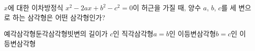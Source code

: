$x$에 대한 이차방정식 $x^2-2ax+b^2-c^2=0$이 허근을 가질 때, 양수 $a$, $b$, $c$를 세 변으로 하는 삼각형은 어떤 삼각형인가?
\begin{choicesv}{예각삼각형}{둔각삼각형}{빗변의 길이가 $c$인 직각삼각형}{$a=b$인 이등변삼각형}{$b=c$인 이등변삼각형}\end{choicesv}
